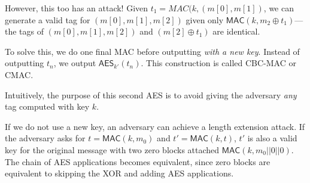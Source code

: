 However, this too has an attack! Given $t_1 = MAC(k, (m[0], m[1])$, we can generate a valid tag for $(m[0], m[1], m[2])$ given only $\mathsf{MAC}(k, m_2 \oplus t_1)$---the tags of $(m[0], m[1], m[2])$ and $(m[2] \oplus t_1)$ are identical.

	To solve this, we do one final MAC before outputting \emph{with a new key}. Instead of outputting $t_n$, we output $\mathsf{AES}_{k'}(t_n)$. This construction is called CBC-MAC or CMAC. %

	Intuitively, the purpose of this second AES is to avoid giving the adversary \textit{any} tag computed with key $k$. 

	If we do not use a new key, an adversary can achieve a length extension attack. If the adversary asks for $t = \mathsf{MAC}(k, m_0)$ and $t' = \mathsf{MAC}(k, t)$, $t'$ is also a valid key for the original message with two zero blocks attached $\mathsf{MAC}(k, m_0 || 0 || 0)$. The chain of AES applications becomes equivalent, since zero blocks are equivalent to skipping the XOR and adding AES applications.

